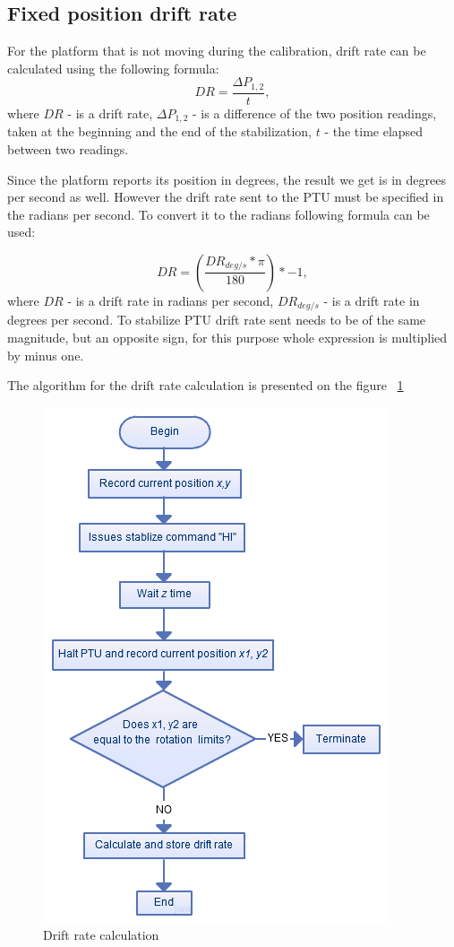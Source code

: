 \subsection{Fixed position drift rate}
For the platform that is not moving during the calibration, drift rate can be calculated using the following formula:
\[DR = \frac {\Delta P_{1,2}}{t},\] where $DR$ - is a drift rate, $\Delta P_{1,2}$ - is a difference of the two position readings, taken at the beginning and the end of the stabilization, $t$ - the time elapsed between two readings.    
    
Since the platform reports its position in degrees, the result we get is in degrees per second as well. However the drift rate sent to the PTU must be specified in the radians per second. To convert it to the radians following formula can be used: 

\[ DR=(\frac{DR_{deg/s} * \pi}{180})*-1,\] where $DR$ - is a drift rate in radians per second, $DR_{deg/s}$ - is a drift rate in degrees per second. To stabilize PTU drift rate sent needs to be of the same magnitude, but an opposite sign, for this purpose whole expression is multiplied by minus one. 

The algorithm for the drift rate calculation is presented on the figure ~\ref{fig:DriftRate}

\begin{figure}[H]
\centering
\centerline{\includegraphics[scale=0.70]{./images/DriftRate}}
\caption{Drift rate calculation}
\label{fig:DriftRate}
\end{figure}

